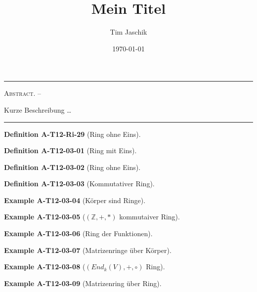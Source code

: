 \documentclass[10pt, letterpaper]{article}
\title{Mein Titel}
\author{Tim Jaschik}
\date{\today}
\newcommand{\Z}{\mathbb{Z}}
\renewenvironment{abstract}
  {
    \begin{adjustwidth}{1.5cm}{1.5cm}
    \small
    \textsc{Abstract. –}%
  }
  {
    \end{adjustwidth}
  }
\newcommand{\CustomHeading}[3]{%
  \par\medskip\noindent%
  \textbf{#1 #2} \textnormal{(#3)}.\enskip%
}
\newenvironment{DEF}[2]{\CustomHeading{Definition}{#1}{#2}}{}
\newenvironment{EXA}[2]{\CustomHeading{Example}{#1}{#2}}{}
\begin{document}
\maketitle
\rule{\textwidth}{0.5pt}
\begin{abstract}
Kurze Beschreibung …
\end{abstract}
\rule{\textwidth}{0.5pt}
\vspace{0.5cm}

\tableofcontents

\pagebreak





\begin{DEF}{A-T12-Ri-29}{Ring ohne Eins}
\end{DEF}

\begin{DEF}{A-T12-03-01}{Ring mit Eins}
\end{DEF}

\begin{DEF}{A-T12-03-02}{Ring ohne Eins}
\end{DEF}

\begin{DEF}{A-T12-03-03}{Kommutativer Ring}
\end{DEF}

\begin{EXA}{A-T12-03-04}{Körper sind Ringe}
\end{EXA}

\begin{EXA}{A-T12-03-05}{$(\Z,+,*)$ kommutaiver Ring}
\end{EXA}

\begin{EXA}{A-T12-03-06}{Ring der Funktionen}
\end{EXA}

\begin{EXA}{A-T12-03-07}{Matrizenringe über Körper}
\end{EXA}

\begin{EXA}{A-T12-03-08}{$(End_k(V),+,\circ)$ Ring}
\end{EXA}

\begin{EXA}{A-T12-03-09}{Matrizenring über Ring}
\end{EXA}
\end{document}
